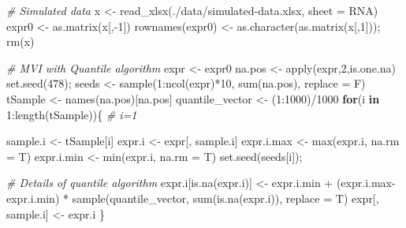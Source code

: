 \documentclass[
  12pt,
]{book}
\newenvironment{Shaded}{\begin{snugshade}}{\end{snugshade}}
\newcommand{\AttributeTok}[1]{\textcolor[rgb]{0.77,0.63,0.00}{#1}}
\newcommand{\CommentTok}[1]{\textcolor[rgb]{0.56,0.35,0.01}{\textit{#1}}}
\newcommand{\ControlFlowTok}[1]{\textcolor[rgb]{0.13,0.29,0.53}{\textbf{#1}}}
\newcommand{\DecValTok}[1]{\textcolor[rgb]{0.00,0.00,0.81}{#1}}
\newcommand{\FunctionTok}[1]{\textcolor[rgb]{0.00,0.00,0.00}{#1}}
\newcommand{\NormalTok}[1]{#1}
\newcommand{\OtherTok}[1]{\textcolor[rgb]{0.56,0.35,0.01}{#1}}
\newcommand{\SpecialCharTok}[1]{\textcolor[rgb]{0.00,0.00,0.00}{#1}}
\newcommand{\StringTok}[1]{\textcolor[rgb]{0.31,0.60,0.02}{#1}}
\begin{document}
\begin{Shaded}
\begin{Highlighting}[]
\CommentTok{\# Simulated data}
\NormalTok{x }\OtherTok{\textless{}{-}} \FunctionTok{read\_xlsx}\NormalTok{(}\StringTok{\textquotesingle{}./data/simulated{-}data.xlsx\textquotesingle{}}\NormalTok{, }\AttributeTok{sheet =} \StringTok{\textquotesingle{}RNA\textquotesingle{}}\NormalTok{)}
\NormalTok{expr0 }\OtherTok{\textless{}{-}} \FunctionTok{as.matrix}\NormalTok{(x[,}\SpecialCharTok{{-}}\DecValTok{1}\NormalTok{])}
\FunctionTok{rownames}\NormalTok{(expr0) }\OtherTok{\textless{}{-}} \FunctionTok{as.character}\NormalTok{(}\FunctionTok{as.matrix}\NormalTok{(x[,}\DecValTok{1}\NormalTok{])); }\FunctionTok{rm}\NormalTok{(x)}

\CommentTok{\# MVI with Quantile algorithm}
\NormalTok{expr }\OtherTok{\textless{}{-}}\NormalTok{ expr0}
\NormalTok{na.pos }\OtherTok{\textless{}{-}} \FunctionTok{apply}\NormalTok{(expr,}\DecValTok{2}\NormalTok{,is.one.na)}
\FunctionTok{set.seed}\NormalTok{(}\DecValTok{478}\NormalTok{); seeds }\OtherTok{\textless{}{-}} \FunctionTok{sample}\NormalTok{(}\DecValTok{1}\SpecialCharTok{:}\FunctionTok{ncol}\NormalTok{(expr)}\SpecialCharTok{*}\DecValTok{10}\NormalTok{, }\FunctionTok{sum}\NormalTok{(na.pos), }\AttributeTok{replace =}\NormalTok{ F)}
\NormalTok{tSample }\OtherTok{\textless{}{-}} \FunctionTok{names}\NormalTok{(na.pos)[na.pos]}
\NormalTok{quantile\_vector }\OtherTok{\textless{}{-}}\NormalTok{ (}\DecValTok{1}\SpecialCharTok{:}\DecValTok{1000}\NormalTok{)}\SpecialCharTok{/}\DecValTok{1000}
\ControlFlowTok{for}\NormalTok{(i }\ControlFlowTok{in} \DecValTok{1}\SpecialCharTok{:}\FunctionTok{length}\NormalTok{(tSample))\{ }\CommentTok{\# i=1}
  
\NormalTok{  sample.i }\OtherTok{\textless{}{-}}\NormalTok{ tSample[i]}
\NormalTok{  expr.i }\OtherTok{\textless{}{-}}\NormalTok{ expr[, sample.i]}
\NormalTok{  expr.i.max }\OtherTok{\textless{}{-}} \FunctionTok{max}\NormalTok{(expr.i, }\AttributeTok{na.rm =}\NormalTok{ T)}
\NormalTok{  expr.i.min }\OtherTok{\textless{}{-}} \FunctionTok{min}\NormalTok{(expr.i, }\AttributeTok{na.rm =}\NormalTok{ T)}
  \FunctionTok{set.seed}\NormalTok{(seeds[i]);}
  
  \CommentTok{\# Details of quantile algorithm}
\NormalTok{  expr.i[}\FunctionTok{is.na}\NormalTok{(expr.i)] }\OtherTok{\textless{}{-}}
\NormalTok{    expr.i.min }\SpecialCharTok{+}
\NormalTok{    (expr.i.max}\SpecialCharTok{{-}}\NormalTok{expr.i.min) }\SpecialCharTok{*} \FunctionTok{sample}\NormalTok{(quantile\_vector,}
                                     \FunctionTok{sum}\NormalTok{(}\FunctionTok{is.na}\NormalTok{(expr.i)),}
                                     \AttributeTok{replace =}\NormalTok{ T)}
\NormalTok{  expr[, sample.i] }\OtherTok{\textless{}{-}}\NormalTok{ expr.i}
\NormalTok{\}}
  


\end{Highlighting}
\end{Shaded}
\end{document}
